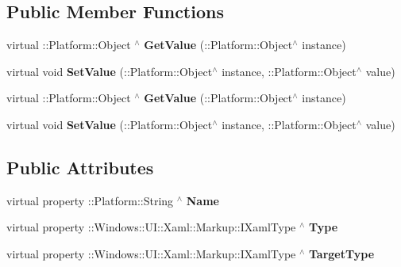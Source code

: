 \subsection*{Public Member Functions}
\begin{DoxyCompactItemize}
\item 
\mbox{\label{class_xaml_type_info_1_1_info_provider_1_1_xaml_member_abd8aeffcd5cf9ab0de67f7cd21bb09e0}} 
virtual \+::Platform\+::\+Object $^\wedge$ {\bfseries Get\+Value} (\+::Platform\+::\+Object$^\wedge$ instance)
\item 
\mbox{\label{class_xaml_type_info_1_1_info_provider_1_1_xaml_member_a091e60ae327bb36dece1558b14c889cc}} 
virtual void {\bfseries Set\+Value} (\+::Platform\+::\+Object$^\wedge$ instance, \+::Platform\+::\+Object$^\wedge$ value)
\item 
\mbox{\label{class_xaml_type_info_1_1_info_provider_1_1_xaml_member_a2c59558f3a5943b7c522686ef29afdce}} 
virtual \+::Platform\+::\+Object $^\wedge$ {\bfseries Get\+Value} (\+::Platform\+::\+Object$^\wedge$ instance)
\item 
\mbox{\label{class_xaml_type_info_1_1_info_provider_1_1_xaml_member_a091e60ae327bb36dece1558b14c889cc}} 
virtual void {\bfseries Set\+Value} (\+::Platform\+::\+Object$^\wedge$ instance, \+::Platform\+::\+Object$^\wedge$ value)
\end{DoxyCompactItemize}
\subsection*{Public Attributes}
\begin{DoxyCompactItemize}
\item 
virtual property \+::Platform\+::\+String $^\wedge$ {\bfseries Name}
\item 
virtual property \+::Windows\+::\+U\+I\+::\+Xaml\+::\+Markup\+::\+I\+Xaml\+Type $^\wedge$ {\bfseries Type}
\item 
virtual property \+::Windows\+::\+U\+I\+::\+Xaml\+::\+Markup\+::\+I\+Xaml\+Type $^\wedge$ {\bfseries Target\+Type}
\end{DoxyCompactItemize}
